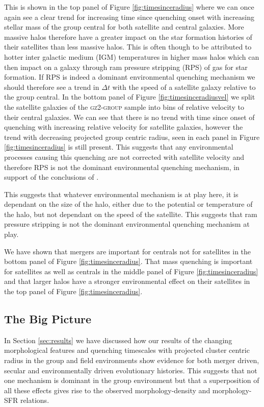 \documentclass[useAMS,usenatbib]{mn2e}
\begin{document}
This is shown in the top panel of Figure \ref{fig:timesinceradius} where we can once again see a clear trend for increasing time since quenching onset with increasing stellar mass of the group central for both satellite and central galaxies. More massive halos therefore have a greater impact on the star formation histories of their satellites than less massive halos. This is often though to be attributed to hotter inter galactic medium (IGM) temperatures in higher mass halos which can then impact on a galaxy through ram pressure stripping (RPS) of gas for star formation. If RPS is indeed a dominant environmental quenching mechanism we should therefore see a trend in $\Delta t$ with the speed of a satellite galaxy relative to the group central.  In the bottom panel of Figure \ref{fig:timesinceradiusvel} we split the satellite galaxies of the \textsc{gz2-group} sample into bins of relative velocity to their central galaxies. We can see that there is no trend with time since onset of quenching with increasing relative velocity for satellite galaxies, however the trend with decreasing projected group centric radius, seen in each panel in Figure \ref{fig:timesinceradius} is still present. This suggests that any environmental processes causing this quenching are not corrected with satellite velocity and therefore RPS is not the dominant environmental quenching mechanism, in support of the conclusions of \citet{Emerick16}.

This suggests that whatever environmental mechanism is at play here, it is dependant on the size of the halo, either due to the potential or temperature of the halo, but not dependant on the speed of the satellite. This suggests that ram pressure stripping is not the dominant environmental quenching mechanism at play. 



We have shown that mergers are important for centrals not for satellites in the bottom panel of Figure \ref{fig:timesinceradius}. That mass quenching is important for satellites as well as centrals in the middle panel of Figure \ref{fig:timesinceradius} and that larger halos have a stronger environmental effect on their satellites in the top panel of Figure \ref{fig:timesinceradius}. 

\subsection{The Big Picture}\label{sec:bigpic}

In Section \ref{sec:results} we have discussed how our results of the changing morphological features and quenching timescales with projected cluster centric radius in the group and field environments show evidence for both merger driven, secular and environmentally driven evolutionary histories. This suggests that not one mechanism is dominant in the group environment but that a superposition of all these effects gives rise to the observed morphology-density and morphology-SFR relations.
\end{document}
